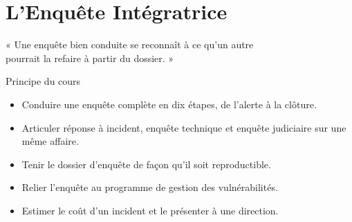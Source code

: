 
\chapter{L'Enquête Intégratrice}
\label{chap:enquete}

\epigraph{%
    « Une enquête bien conduite se reconnaît à ce qu'un autre\\
    pourrait la refaire à partir du dossier. »%
}{Principe du cours}


\begin{boxobjectifs}
\begin{itemize}
    \item Conduire une enquête complète en dix étapes, de l'alerte à la
          clôture.
    \item Articuler réponse à incident, enquête technique et enquête
          judiciaire sur une même affaire.
    \item Tenir le dossier d'enquête de façon qu'il soit reproductible.
    \item Relier l'enquête au programme de gestion des vulnérabilités.
    \item Estimer le coût d'un incident et le présenter à une direction.
\end{itemize}
\end{boxobjectifs}

\bigskip

